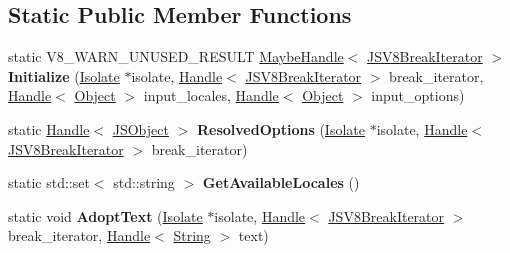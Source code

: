 \subsection*{Static Public Member Functions}
\begin{DoxyCompactItemize}
\item 
\mbox{\label{classv8_1_1internal_1_1JSV8BreakIterator_a5b84066fc6ad70b0d0aac237bc49253d}} 
static V8\+\_\+\+W\+A\+R\+N\+\_\+\+U\+N\+U\+S\+E\+D\+\_\+\+R\+E\+S\+U\+LT \mbox{\hyperlink{classv8_1_1internal_1_1MaybeHandle}{Maybe\+Handle}}$<$ \mbox{\hyperlink{classv8_1_1internal_1_1JSV8BreakIterator}{J\+S\+V8\+Break\+Iterator}} $>$ {\bfseries Initialize} (\mbox{\hyperlink{classv8_1_1internal_1_1Isolate}{Isolate}} $\ast$isolate, \mbox{\hyperlink{classv8_1_1internal_1_1Handle}{Handle}}$<$ \mbox{\hyperlink{classv8_1_1internal_1_1JSV8BreakIterator}{J\+S\+V8\+Break\+Iterator}} $>$ break\+\_\+iterator, \mbox{\hyperlink{classv8_1_1internal_1_1Handle}{Handle}}$<$ \mbox{\hyperlink{classv8_1_1internal_1_1Object}{Object}} $>$ input\+\_\+locales, \mbox{\hyperlink{classv8_1_1internal_1_1Handle}{Handle}}$<$ \mbox{\hyperlink{classv8_1_1internal_1_1Object}{Object}} $>$ input\+\_\+options)
\item 
\mbox{\label{classv8_1_1internal_1_1JSV8BreakIterator_ac8ba15545b277222cabd8950803e551e}} 
static \mbox{\hyperlink{classv8_1_1internal_1_1Handle}{Handle}}$<$ \mbox{\hyperlink{classv8_1_1internal_1_1JSObject}{J\+S\+Object}} $>$ {\bfseries Resolved\+Options} (\mbox{\hyperlink{classv8_1_1internal_1_1Isolate}{Isolate}} $\ast$isolate, \mbox{\hyperlink{classv8_1_1internal_1_1Handle}{Handle}}$<$ \mbox{\hyperlink{classv8_1_1internal_1_1JSV8BreakIterator}{J\+S\+V8\+Break\+Iterator}} $>$ break\+\_\+iterator)
\item 
\mbox{\label{classv8_1_1internal_1_1JSV8BreakIterator_a320ff69020e1c9df0a34532fd6441603}} 
static std\+::set$<$ std\+::string $>$ {\bfseries Get\+Available\+Locales} ()
\item 
\mbox{\label{classv8_1_1internal_1_1JSV8BreakIterator_a545356f97ff0b276ff9c7e57f4d13a99}} 
static void {\bfseries Adopt\+Text} (\mbox{\hyperlink{classv8_1_1internal_1_1Isolate}{Isolate}} $\ast$isolate, \mbox{\hyperlink{classv8_1_1internal_1_1Handle}{Handle}}$<$ \mbox{\hyperlink{classv8_1_1internal_1_1JSV8BreakIterator}{J\+S\+V8\+Break\+Iterator}} $>$ break\+\_\+iterator, \mbox{\hyperlink{classv8_1_1internal_1_1Handle}{Handle}}$<$ \mbox{\hyperlink{classv8_1_1internal_1_1String}{String}} $>$ text)

\end{DoxyCompactItemize}
